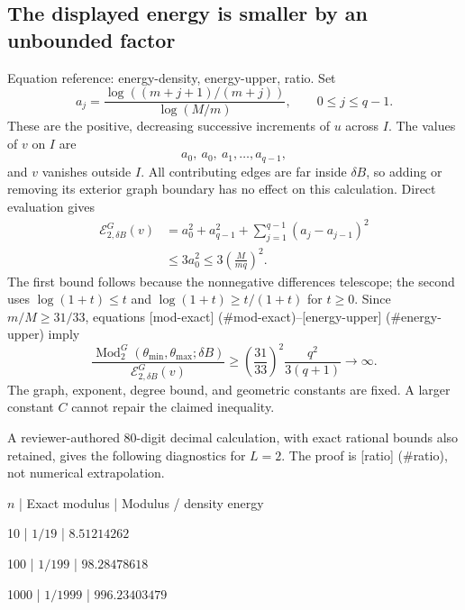 \documentclass[10pt]{article}
\begin{document}
\subsection*{The displayed energy is smaller by an unbounded factor}
Equation reference: energy-density, energy-upper, ratio. Set \[a_j=\frac{\log((m+j+1)/(m+j))}{\log(M/m)},\qquad 0\le j\le q-1.\] These are the positive, decreasing successive increments of \(u\) across \(I\). The values of \(v\) on \(I\) are \[a_0,\ a_0,\ a_1,\ldots,a_{q-1},\] and \(v\) vanishes outside \(I\). All contributing edges are far inside \(\delta B\), so adding or removing its exterior graph boundary has no effect on this calculation. Direct evaluation gives \[\begin{aligned}
 \mathcal E^G_{2,\delta B}(v)
 &=a_0^2+a_{q-1}^2+\sum_{j=1}^{q-1}(a_j-a_{j-1})^2 \\
 &\le3a_0^2
 \le3\left(\frac{M}{mq}\right)^2. \end{aligned}\] The first bound follows because the nonnegative differences telescope; the second uses \(\log(1+t)\le t\) and \(\log(1+t)\ge t/(1+t)\) for \(t\ge0\). Since \(m/M\ge31/33\), equations [mod-exact] (\#mod-exact)–[energy-upper] (\#energy-upper) imply \[
 \frac{\operatorname{Mod}_2^G(\theta_{\min},\theta_{\max};\delta B)}
 {\mathcal E^G_{2,\delta B}(v)}
 \ge \left(\frac{31}{33}\right)^2\frac{q^2}{3(q+1)}
 \longrightarrow\infty.\] The graph, exponent, degree bound, and geometric constants are fixed. A larger constant \(C\) cannot repair the claimed inequality.\par
A reviewer-authored 80-digit decimal calculation, with exact rational bounds also retained, gives the following diagnostics for \(L=2\). The proof is [ratio] (\#ratio), not numerical extrapolation.\par
\(n\) | Exact modulus | Modulus / density energy\par
10 | \(1/19\) | \(8.51214262\)\par
100 | \(1/199\) | \(98.28478618\)\par
1000 | \(1/1999\) | \(996.23403479\)\par
\end{document}
